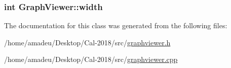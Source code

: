 \subsubsection[{\texorpdfstring{width}{width}}]{\setlength{\rightskip}{0pt plus 5cm}int Graph\+Viewer\+::width\hspace{0.3cm}{\ttfamily [private]}}\hypertarget{classGraphViewer_a5de27a1d20968b8494cd4bf5a4eb27e1}{}\label{classGraphViewer_a5de27a1d20968b8494cd4bf5a4eb27e1}


The documentation for this class was generated from the following files\+:\begin{DoxyCompactItemize}
\item 
/home/amadeu/\+Desktop/\+Cal-\/2018/src/\hyperlink{graphviewer_8h}{graphviewer.\+h}\item 
/home/amadeu/\+Desktop/\+Cal-\/2018/src/\hyperlink{graphviewer_8cpp}{graphviewer.\+cpp}\end{DoxyCompactItemize}
